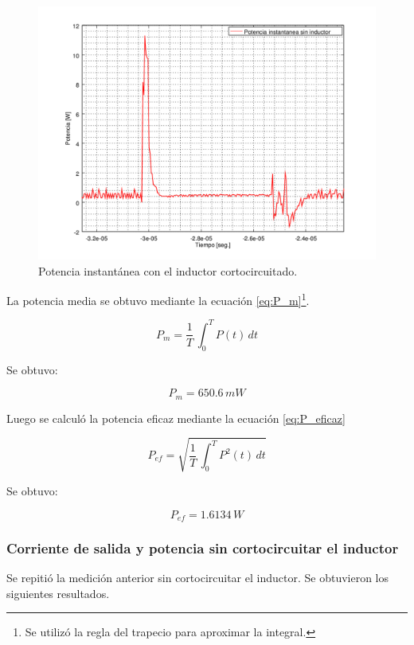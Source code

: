 \documentclass[10pt,spanish,a4paper,openany,notitlepage]{article}
\begin{document}
\begin{figure}[H]
\centering
\includegraphics[scale=0.65]{./Octave/IGBT/Potencia_sin_L.png}
\caption{Potencia instantánea con el inductor cortocircuitado.}
\label{fig:P_sin_L}
\end{figure}

La potencia media se obtuvo mediante la ecuación \ref{eq:P_m}\footnote{Se 
utilizó la regla del trapecio para aproximar la integral.}.


\begin{equation}
P_m = \frac{1}{T}\, \int_0^T \! P(t) \, dt
\label{eq:P_m}
\end{equation}

Se obtuvo:

\[ \displaystyle P_m=650.6\,\unit{mW} \]

Luego se calculó la potencia eficaz mediante la ecuación \ref{eq:P_eficaz}

\begin{equation}
P_{ef} = \sqrt{\frac{1}{T}\, \int_0^T \! P^2(t) \, dt}
\label{eq:P_eficaz}
\end{equation}

Se obtuvo:

\[ \displaystyle P_{ef}= 1.6134\,\unit{W} \]

\subsubsection{Corriente de salida y potencia sin cortocircuitar el inductor}

Se repitió la medición anterior sin cortocircuitar el inductor. Se obtuvieron
los siguientes resultados.
\end{document}
